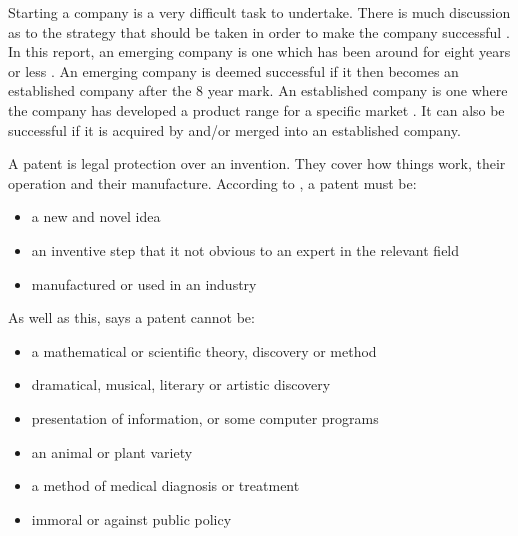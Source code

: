 {}


Starting a company is a very difficult task to undertake. 
There is much discussion as to the strategy that should be taken in order to make the company successful \cite{hsu2006venture,smith1997utility}.
In this report, an emerging company is one which has been around for eight years or less \cite{zahra1996technology}. 
An emerging company is deemed successful if it then becomes an established company after the 8 year mark.
An established company is one where the company has developed a product range for a specific market \cite{kekale2007successful}.
It can also be successful if it is acquired by and/or merged into an established company. 

A patent is legal protection over an invention.
They cover how things work, their operation and their manufacture. 
According to \cite{ipopatent}, a patent must be:
\begin{itemize}
\item a new and novel idea
\item an inventive step that it not obvious to an expert in the relevant field
\item manufactured or used in an industry
\end{itemize}

As well as this, \cite{ipopatent} says a patent cannot be:
\begin{itemize}
\item a mathematical or scientific theory, discovery or method
\item dramatical, musical, literary or artistic discovery
\item presentation of information, or some computer programs
\item an animal or plant variety
\item a method of medical diagnosis or treatment
\item immoral or against public policy
\end{itemize}


